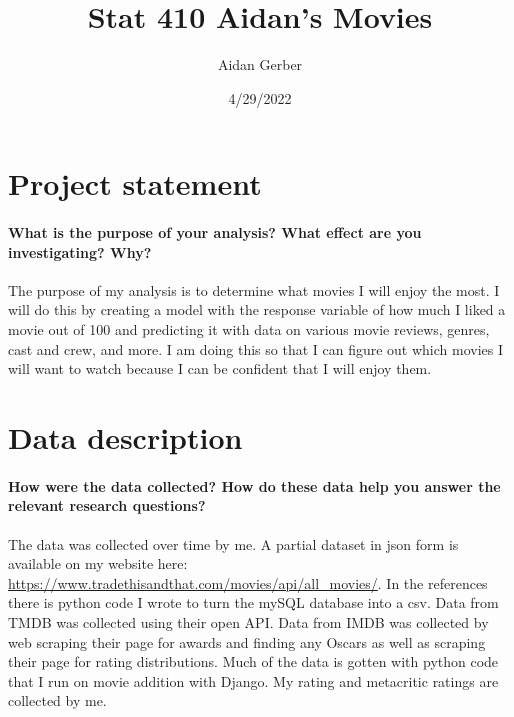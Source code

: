 \documentclass[
]{article}
\title{Stat 410 Aidan's Movies}
\author{Aidan Gerber}
\date{4/29/2022}
\begin{document}
\maketitle

{
\setcounter{tocdepth}{3}
\tableofcontents
}
\doublespacing

\hypertarget{project-statement}{%
\section{Project statement}\label{project-statement}}

\hypertarget{what-is-the-purpose-of-your-analysis-what-effect-are-you-investigating-why}{%
\paragraph{What is the purpose of your analysis? What effect are you
investigating?
Why?}\label{what-is-the-purpose-of-your-analysis-what-effect-are-you-investigating-why}}

The purpose of my analysis is to determine what movies I will enjoy the
most. I will do this by creating a model with the response variable of
how much I liked a movie out of 100 and predicting it with data on
various movie reviews, genres, cast and crew, and more. I am doing this
so that I can figure out which movies I will want to watch because I can
be confident that I will enjoy them.

\hypertarget{data-description}{%
\section{Data description}\label{data-description}}

\hypertarget{how-were-the-data-collected-how-do-these-data-help-you-answer-the-relevant-research-questions}{%
\paragraph{How were the data collected? How do these data help you
answer the relevant research
questions?}\label{how-were-the-data-collected-how-do-these-data-help-you-answer-the-relevant-research-questions}}

The data was collected over time by me. A partial dataset in json form
is available on my website here:
\url{https://www.tradethisandthat.com/movies/api/all_movies/}. In the
references there is python code I wrote to turn the mySQL database into
a csv. Data from TMDB was collected using their open API. Data from IMDB
was collected by web scraping their page for awards and finding any
Oscars as well as scraping their page for rating distributions. Much of
the data is gotten with python code that I run on movie addition with
Django. My rating and metacritic ratings are collected by me.
\end{document}
